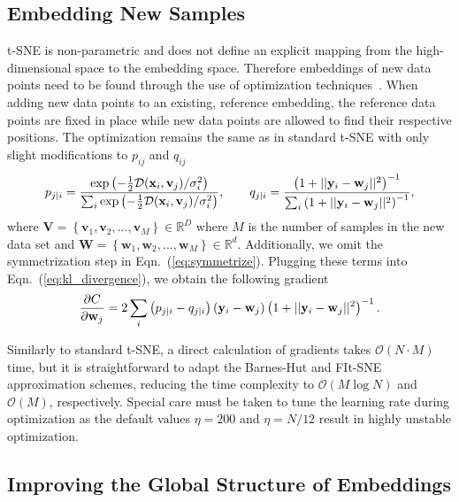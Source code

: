 \documentclass[article]{jss}
\begin{document}
\subsection{Embedding New Samples} \label{sec:meth.transform}

t-SNE is non-parametric and does not define an explicit mapping from the
high-dimensional space to the embedding space. Therefore embeddings of new data
points need to be found through the use of optimization
techniques~\citep{policar2021embedding}. When adding new data points to an
existing, reference embedding, the reference data points are fixed in place
while new data points are allowed to find their respective positions. The
optimization remains the same as in standard t-SNE with only slight
modifications to $p_{ij}$ and $q_{ij}$
\begin{align}
p_{j \mid i} = \frac{\exp \left ( -\frac{1}{2} \mathcal{D}(\mathbf{x}_i, \mathbf{v}_j) /  \sigma_i^2 \right )}{\sum_{i} \exp \left ( -\frac{1}{2} \mathcal{D}(\mathbf{x}_i, \mathbf{v}_j) / \sigma_i^2 \right )}, \qquad
q_{j \mid i} = \frac{\left ( 1 + || \mathbf{y}_i - \mathbf{w}_j ||^2 \right )^{-1}}{\sum_{i}\left ( 1 + || \mathbf{y}_i - \mathbf{w}_j ||^2 \right )^{-1}}, \notag
\end{align}
\noindent where $\mathbf{V} = \left \{ \mathbf{v}_1, \mathbf{v}_2, \dots,
\mathbf{v}_M \right \} \in \mathbb{R}^D$ where $M$ is the number of samples in
the new data set and $\mathbf{W} = \left \{ \mathbf{w}_1, \mathbf{w}_2, \dots,
\mathbf{w}_M \right \} \in \mathbb{R}^d$. Additionally, we omit the
symmetrization step in Eqn.~(\ref{eq:symmetrize}). Plugging these terms into
Eqn.~(\ref{eq:kl_divergence}), we obtain the following gradient
\begin{equation}
\frac{\partial C}{\partial \mathbf{w}_j} = 2 \sum_i \left ( p_{j \mid i} - q_{j \mid i} \right ) \left ( \mathbf{y}_i - \mathbf{w}_j \right ) \left ( 1 + || \mathbf{y}_i - \mathbf{w}_j || ^2 \right )^{-1}. \notag
\label{eq:gradient}
\end{equation}

Similarly to standard t-SNE, a direct calculation of gradients takes
$\mathcal{O}(N \cdot M)$ time, but it is straightforward to adapt the Barnes-Hut
and FIt-SNE approximation schemes, reducing the time complexity to
$\mathcal{O}(M \log N)$ and $\mathcal{O}(M)$, respectively. Special care must be
taken to tune the learning rate during optimization as the default values
$\eta=200$ and $\eta=N/12$ result in highly unstable optimization.


\subsection{Improving the Global Structure of Embeddings} \label{sec:meth.global}
\end{document}
